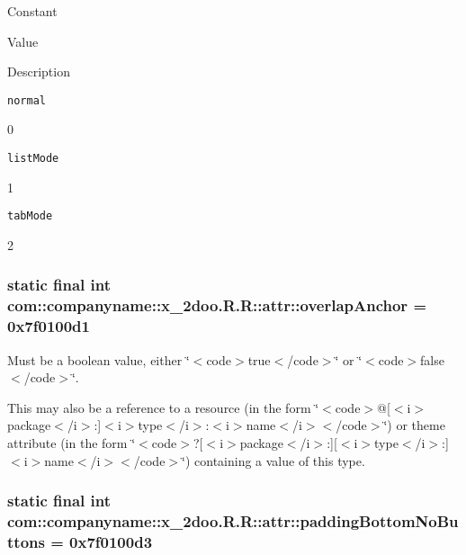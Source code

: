Constant

Value

Description 

{\tt normal}

0

{\tt listMode}

1

{\tt tabMode}

2\hypertarget{classcom_1_1companyname_1_1x__2doo_1_1_r_1_1attr_ba43bea4da1aa20643c906ef4f4c74bb}{
\subsubsection[{overlapAnchor}]{\setlength{\rightskip}{0pt plus 5cm}static final int com::companyname::x\_\-2doo.R.R::attr::overlapAnchor = 0x7f0100d1}}
\label{classcom_1_1companyname_1_1x__2doo_1_1_r_1_1attr_ba43bea4da1aa20643c906ef4f4c74bb}


Must be a boolean value, either \char`\"{}$<$code$>$true$<$/code$>$\char`\"{} or \char`\"{}$<$code$>$false$<$/code$>$\char`\"{}. 

This may also be a reference to a resource (in the form \char`\"{}$<$code$>$@\mbox{[}$<$i$>$package$<$/i$>$:\mbox{]}$<$i$>$type$<$/i$>$:$<$i$>$name$<$/i$>$$<$/code$>$\char`\"{}) or theme attribute (in the form \char`\"{}$<$code$>$?\mbox{[}$<$i$>$package$<$/i$>$:\mbox{]}\mbox{[}$<$i$>$type$<$/i$>$:\mbox{]}$<$i$>$name$<$/i$>$$<$/code$>$\char`\"{}) containing a value of this type. \hypertarget{classcom_1_1companyname_1_1x__2doo_1_1_r_1_1attr_c8c43a45f18ef218dbd075aea08fc41c}{
\subsubsection[{paddingBottomNoButtons}]{\setlength{\rightskip}{0pt plus 5cm}static final int com::companyname::x\_\-2doo.R.R::attr::paddingBottomNoButtons = 0x7f0100d3}}
\label{classcom_1_1companyname_1_1x__2doo_1_1_r_1_1attr_c8c43a45f18ef218dbd075aea08fc41c}


